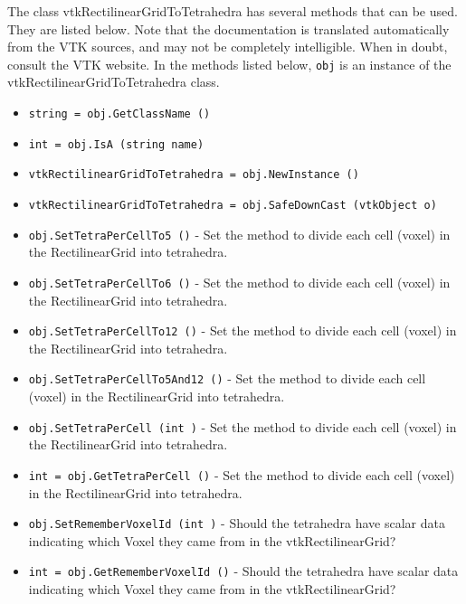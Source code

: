 The class vtkRectilinearGridToTetrahedra has several methods that can be used.
  They are listed below.
Note that the documentation is translated automatically from the VTK sources,
and may not be completely intelligible.  When in doubt, consult the VTK website.
In the methods listed below, \verb|obj| is an instance of the vtkRectilinearGridToTetrahedra class.
\begin{itemize}
\item  \verb|string = obj.GetClassName ()|

\item  \verb|int = obj.IsA (string name)|

\item  \verb|vtkRectilinearGridToTetrahedra = obj.NewInstance ()|

\item  \verb|vtkRectilinearGridToTetrahedra = obj.SafeDownCast (vtkObject o)|

\item  \verb|obj.SetTetraPerCellTo5 ()| -  Set the method to divide each cell (voxel) in the RectilinearGrid
 into tetrahedra.

\item  \verb|obj.SetTetraPerCellTo6 ()| -  Set the method to divide each cell (voxel) in the RectilinearGrid
 into tetrahedra.

\item  \verb|obj.SetTetraPerCellTo12 ()| -  Set the method to divide each cell (voxel) in the RectilinearGrid
 into tetrahedra.

\item  \verb|obj.SetTetraPerCellTo5And12 ()| -  Set the method to divide each cell (voxel) in the RectilinearGrid
 into tetrahedra.

\item  \verb|obj.SetTetraPerCell (int )| -  Set the method to divide each cell (voxel) in the RectilinearGrid
 into tetrahedra.

\item  \verb|int = obj.GetTetraPerCell ()| -  Set the method to divide each cell (voxel) in the RectilinearGrid
 into tetrahedra.

\item  \verb|obj.SetRememberVoxelId (int )| -  Should the tetrahedra have scalar data
 indicating which Voxel they came from in the vtkRectilinearGrid?

\item  \verb|int = obj.GetRememberVoxelId ()| -  Should the tetrahedra have scalar data
 indicating which Voxel they came from in the vtkRectilinearGrid?


\end{itemize}
